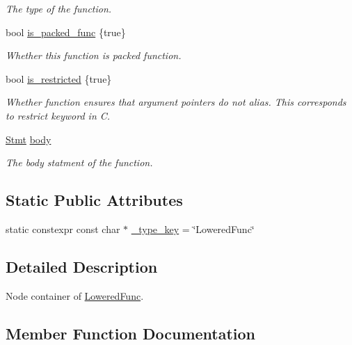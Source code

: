 \begin{DoxyCompactItemize}
\begin{DoxyCompactList}\small\item\em The type of the function. \end{DoxyCompactList}\item 
bool \hyperlink{classtvm_1_1tir_1_1LoweredFuncNode_abfe5c1806998239b88c001e335200f82}{is\+\_\+packed\+\_\+func} \{true\}
\begin{DoxyCompactList}\small\item\em Whether this function is packed function. \end{DoxyCompactList}\item 
bool \hyperlink{classtvm_1_1tir_1_1LoweredFuncNode_af5b31c9e4cf7a0f2064385a93e19e816}{is\+\_\+restricted} \{true\}
\begin{DoxyCompactList}\small\item\em Whether function ensures that argument pointers do not alias. This corresponds to restrict keyword in C. \end{DoxyCompactList}\item 
\hyperlink{classtvm_1_1tir_1_1Stmt}{Stmt} \hyperlink{classtvm_1_1tir_1_1LoweredFuncNode_a9cc563727ba34c90efb647195be90f8d}{body}
\begin{DoxyCompactList}\small\item\em The body statment of the function. \end{DoxyCompactList}\end{DoxyCompactItemize}
\subsection*{Static Public Attributes}
\begin{DoxyCompactItemize}
\item 
static constexpr const char $\ast$ \hyperlink{classtvm_1_1tir_1_1LoweredFuncNode_a1d9db20221331f0000d32809da908d74}{\+\_\+type\+\_\+key} = \char`\"{}Lowered\+Func\char`\"{}
\end{DoxyCompactItemize}


\subsection{Detailed Description}
Node container of \hyperlink{classtvm_1_1tir_1_1LoweredFunc}{Lowered\+Func}. 

\subsection{Member Function Documentation}
